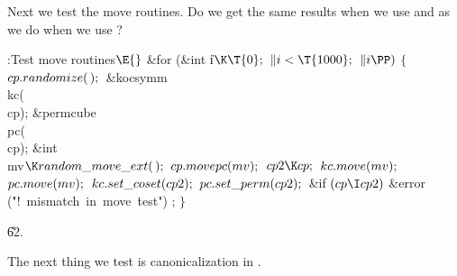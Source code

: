 Next we test the move routines.  Do we get the same results
when we use  and  as we do when we use ?

\Y\B\4:Test move routines\X${}\E{}$\6
\&{for} (\&{int} \|i${}\K\T{0};{}$ ${}\|i<\T{1000};{}$ ${}\|i\PP){}$\5
${}\{{}$\1\6
${}\\{cp}.\\{randomize}(\,);{}$\7
\&{kocsymm} \\{kc}(\\{cp});\6
\&{permcube} \\{pc}(\\{cp});\6
\&{int} \\{mv}${}\K\\{random\_move\_ext}(\,);{}$\7
${}\\{cp}.\\{movepc}(\\{mv});{}$\6
${}\\{cp2}\K\\{cp};{}$\6
${}\\{kc}.\\{move}(\\{mv});{}$\6
${}\\{pc}.\\{move}(\\{mv});{}$\6
${}\\{kc}.\\{set\_coset}(\\{cp2});{}$\6
${}\\{pc}.\\{set\_perm}(\\{cp2});{}$\6
\&{if} ${}(\\{cp}\I\\{cp2}){}$\1\6
\&{error} (\.{"!\ mismatch\ in\ move\ }\)\.{test"})\1\5
;\2\2\6
\4${}\}{}$\2\par
\U62.\fi

The next thing we test is canonicalization in .

